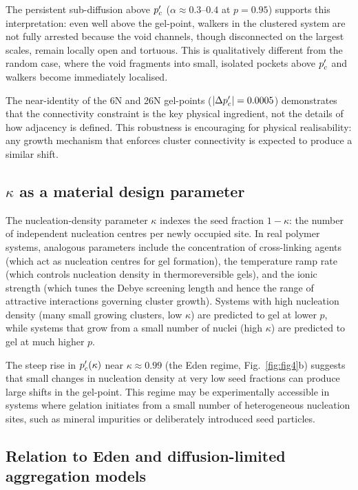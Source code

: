 The persistent sub-diffusion above $p_c'$ ($\alpha \approx 0.3$--$0.4$ at $p = 0.95$) supports this interpretation: even well above the gel-point, walkers in the clustered system are not fully arrested because the void channels, though disconnected on the largest scales, remain locally open and tortuous. This is qualitatively different from the random case, where the void fragments into small, isolated pockets above $p_c'$ and walkers become immediately localised.

The near-identity of the 6N and 26N gel-points ($|\Delta p_c'| = 0.0005$) demonstrates that the connectivity constraint is the key physical ingredient, not the details of how adjacency is defined. This robustness is encouraging for physical realisability: any growth mechanism that enforces cluster connectivity is expected to produce a similar shift.

\subsection{$\kappa$ as a material design parameter}

The nucleation-density parameter $\kappa$ indexes the seed fraction $1-\kappa$: the number of independent nucleation centres per newly occupied site. In real polymer systems, analogous parameters include the concentration of cross-linking agents (which act as nucleation centres for gel formation), the temperature ramp rate (which controls nucleation density in thermoreversible gels), and the ionic strength (which tunes the Debye screening length and hence the range of attractive interactions governing cluster growth). Systems with high nucleation density (many small growing clusters, low $\kappa$) are predicted to gel at lower $p$, while systems that grow from a small number of nuclei (high $\kappa$) are predicted to gel at much higher $p$.

The steep rise in $p_c'(\kappa)$ near $\kappa \approx 0.99$ (the Eden regime, Fig.~\ref{fig:fig4}b) suggests that small changes in nucleation density at very low seed fractions can produce large shifts in the gel-point. This regime may be experimentally accessible in systems where gelation initiates from a small number of heterogeneous nucleation sites, such as mineral impurities or deliberately introduced seed particles.

\subsection{Relation to Eden and diffusion-limited aggregation models}

